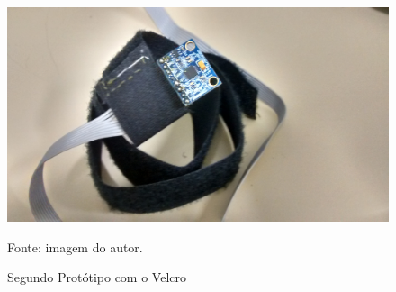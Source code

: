 	 	\begin{figure}[h]
	 		\centering
	 		\includegraphics[keepaspectratio=true,scale=0.15]{figuras/prototipo_2_1.jpg}
	 		\caption{Segundo Protótipo com o Velcro}
	 		Fonte: imagem do autor. 
	 		\label{prototipo2}	
	 	\end{figure}
